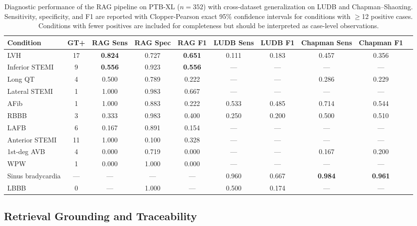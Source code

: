\documentclass[journal,compsoc]{IEEEtran}
\begin{document}
\begin{table}[t]
\centering
\caption{Diagnostic performance of the RAG pipeline on PTB-XL ($n = 352$) with cross-dataset generalization on LUDB and Chapman--Shaoxing. Sensitivity, specificity, and F1 are reported with Clopper-Pearson exact 95\% confidence intervals for conditions with $\geq$12 positive cases. Conditions with fewer positives are included for completeness but should be interpreted as case-level observations.}
\label{tab:rag}
\begin{tabular}{lccccccccc}
\toprule
Condition & GT+ & RAG Sens & RAG Spec & RAG F1 & LUDB Sens & LUDB F1 & Chapman Sens & Chapman F1 \\
\midrule
LVH & 17 & \textbf{0.824} & 0.727 & \textbf{0.651} & 0.111 & 0.183 & 0.457 & 0.356 \\
Inferior STEMI & 9 & \textbf{0.556} & 0.923 & \textbf{0.556} & --- & --- & --- & --- \\
Long QT & 4 & 0.500 & 0.789 & 0.222 & --- & --- & 0.286 & 0.229 \\
Lateral STEMI & 1 & 1.000 & 0.983 & 0.667 & --- & --- & --- & --- \\
AFib & 1 & 1.000 & 0.883 & 0.222 & 0.533 & 0.485 & 0.714 & 0.544 \\
RBBB & 3 & 0.333 & 0.983 & 0.400 & 0.250 & 0.200 & 0.500 & 0.510 \\
LAFB & 6 & 0.167 & 0.891 & 0.154 & --- & --- & --- & --- \\
Anterior STEMI & 11 & 1.000 & 0.100 & 0.328 & --- & --- & --- & --- \\
1st-deg AVB & 4 & 0.000 & 0.719 & 0.000 & --- & --- & 0.167 & 0.200 \\
WPW & 1 & 0.000 & 1.000 & 0.000 & --- & --- & --- & --- \\
Sinus bradycardia & --- & --- & --- & --- & 0.960 & 0.667 & \textbf{0.984} & \textbf{0.961} \\
LBBB & 0 & --- & 1.000 & --- & 0.500 & 0.174 & --- & --- \\
\bottomrule
\end{tabular}
\end{table}


\subsection{Retrieval Grounding and Traceability}
\label{sec:results_grounding}
\end{document}
